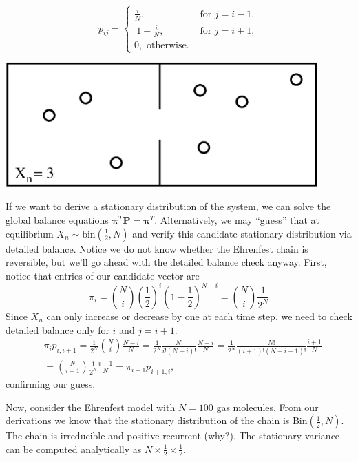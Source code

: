\documentclass[11pt]{article}
\numberwithin{algorithm}{section}
\theoremstyle{remark}
\theoremstyle{definition}
\numberwithin{equation}{section}
\numberwithin{figure}{section}
\begin{document}
\begin{minipage}[c]{0.5\textwidth}
  \[
  p_{ij} =
  \begin{cases}
    \frac{i}{N}. &\text{ for } j=i-1,\\\
    1-\frac{i}{N}, &\text{ for } j=i+1,\\
    0, \text{ otherwise}.
  \end{cases}
  \]
\end{minipage}
\begin{minipage}[r]{0.45\textwidth}
  \vspace{0.2cm}
  \includegraphics[width=0.9\textwidth]{ehrenfest}
  \vspace{0.3cm}
\end{minipage}

If we want to derive a stationary distribution of the system, we can solve the global balance equations
$\boldsymbol{\pi}^T \mathbf{P} = \boldsymbol{\pi}^{T}$. Alternatively, we may ``guess'' that at
equilibrium $X_n \sim \text{bin}(\frac{1}{2}, N)$ and verify this candidate stationary distribution
via detailed balance. Notice we do not know whether the Ehrenfest chain is reversible, but we'll go
ahead with the detailed balance check anyway. First, notice that entries of our candidate vector are
\begin{equation*}
  \pi_i = {N \choose i} \left(\frac{1}{2}\right)^i\left(1-\frac{1}{2}\right)^{N-i} = 
  {N \choose i} \frac{1}{2^N}
\end{equation*}
Since $X_n$ can only increase or decrease by one at each time step, we need to check detailed balance 
only for $i$ and $j = i + 1$.  
\[
\begin{split}
  &\pi_i p_{i,i+1} = \frac{1}{2^N}{N \choose i} \frac{N - i}{N} =
  \frac{1}{2^N} \frac{N!}{i!(N-i)!} \frac{N - i}{N} =
  \frac{1}{2^N} \frac{N!}{(i+1)!(N-i-1)!} \frac{i+1}{N}\\
  &= {N \choose i+1} \frac{1}{2^N} \frac{i+1}{N} = \pi_{i+1} p_{i+1,i},
\end{split}
\]
confirming our guess.
\par
Now, consider the Ehrenfest model with $N=100$ gas molecules. 
From our derivations we know that 
  the stationary distribution of the chain is $\text{Bin}(\frac{1}{2},N)$. The chain is irreducible
  and positive recurrent (why?). The stationary variance can be computed analytically as 
  $N\times\frac{1}{2}\times\frac{1}{2}$. 
\end{document}
